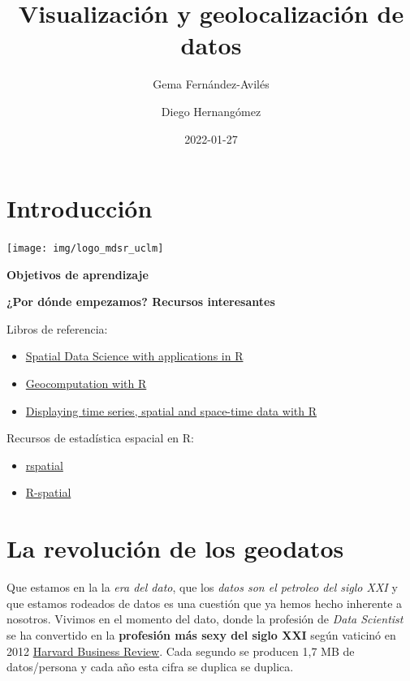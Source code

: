 \documentclass[
]{book}
\title{Visualización y geolocalización de datos}
\author{Gema Fernández-Avilés \and Diego Hernangómez}
\date{2022-01-27}
\providecommand{\tightlist}{%
  \setlength{\itemsep}{0pt}\setlength{\parskip}{0pt}}
\begin{document}
\maketitle

{
\setcounter{tocdepth}{1}
\tableofcontents
}
\hypertarget{introducciuxf3n}{%
\chapter*{Introducción}\label{introducciuxf3n}}

\begin{center}\texttt{[image: img/logo\_mdsr\_uclm]} \end{center}

\textbf{Objetivos de aprendizaje}

\textbf{¿Por dónde empezamos? Recursos interesantes}

Libros de referencia:

\begin{itemize}
\item
  \href{https://keen-swartz-3146c4.netlify.app/}{Spatial Data Science with applications in
  R}
\item
  \href{https://geocompr.robinlovelace.net/}{Geocomputation with R}
\item
  \href{https://oscarperpinan.github.io/bookvis/}{Displaying time series, spatial and space-time data with
  R}
\end{itemize}

Recursos de estadística espacial en R:

\begin{itemize}
\tightlist
\item
  \href{https://rspatial.org/}{rspatial}
\item
  \href{https://r-spatial.org/projects/}{R-spatial}
\end{itemize}

\hypertarget{la-revoluciuxf3n-de-los-geodatos}{%
\chapter{La revolución de los geodatos}\label{la-revoluciuxf3n-de-los-geodatos}}

Que estamos en la la \emph{era del dato}, que los \emph{datos son el petroleo del siglo
XXI} y que estamos rodeados de datos es una cuestión que ya hemos hecho
inherente a nosotros. Vivimos en el momento del dato, donde la profesión de
\emph{Data Scientist} se ha convertido en la \textbf{profesión más sexy del siglo XXI}
según vaticinó en 2012 \href{https://hbr.org/2012/10/data-scientist-the-sexiest-job-of-the-21st-century}{Harvard Business
Review}.
Cada segundo se producen 1,7 MB de datos/persona y cada año esta cifra se
duplica se duplica.
\end{document}

